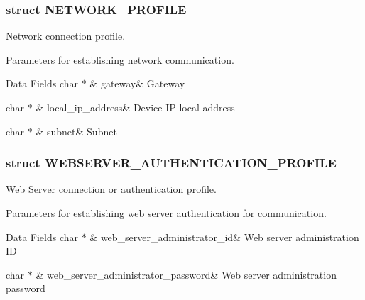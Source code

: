 \subsubsection{struct N\+E\+T\+W\+O\+R\+K\+\_\+\+P\+R\+O\+F\+I\+LE}
Network connection profile. 

Parameters for establishing network communication. \begin{DoxyFields}{Data Fields}
char $\ast$\hypertarget{group__wireless__interface_a89b52c891d51bbea77655f26cc3922af}{}\label{group__wireless__interface_a89b52c891d51bbea77655f26cc3922af}
&
gateway&
Gateway \\
\hline

char $\ast$\hypertarget{group__wireless__interface_a5d0179e2924336bee8c64aa64c519f8b}{}\label{group__wireless__interface_a5d0179e2924336bee8c64aa64c519f8b}
&
local\+\_\+ip\+\_\+address&
Device IP local address \\
\hline

char $\ast$\hypertarget{group__wireless__interface_af09a2e349a8aac3b72d613bb7056ac67}{}\label{group__wireless__interface_af09a2e349a8aac3b72d613bb7056ac67}
&
subnet&
Subnet \\
\hline

\end{DoxyFields}
\label{struct_w_e_b_s_e_r_v_e_r___a_u_t_h_e_n_t_i_c_a_t_i_o_n___p_r_o_f_i_l_e}
\hypertarget{group__wireless__interface_struct_w_e_b_s_e_r_v_e_r___a_u_t_h_e_n_t_i_c_a_t_i_o_n___p_r_o_f_i_l_e}{}
\subsubsection{struct W\+E\+B\+S\+E\+R\+V\+E\+R\+\_\+\+A\+U\+T\+H\+E\+N\+T\+I\+C\+A\+T\+I\+O\+N\+\_\+\+P\+R\+O\+F\+I\+LE}
Web Server connection or authentication profile. 

Parameters for establishing web server authentication for communication. \begin{DoxyFields}{Data Fields}
char $\ast$\hypertarget{group__wireless__interface_aad38b5ab84dab28c431a72de004a821d}{}\label{group__wireless__interface_aad38b5ab84dab28c431a72de004a821d}
&
web\+\_\+server\+\_\+administrator\+\_\+id&
Web server administration ID \\
\hline

char $\ast$\hypertarget{group__wireless__interface_a02a33be193cf12a7cae0b9d63337f930}{}\label{group__wireless__interface_a02a33be193cf12a7cae0b9d63337f930}
&
web\+\_\+server\+\_\+administrator\+\_\+password&
Web server administration password \\
\hline

\end{DoxyFields}


